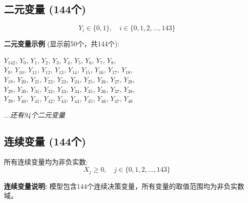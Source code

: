 \documentclass[a4paper,10pt]{article}
\begin{document}
\subsection{二元变量 (144个)}

\begin{equation}
Y_i \in \{0,1\}, \quad i \in \{0, 1, 2, \ldots, 143\}
\end{equation}

\textbf{二元变量示例} (显示前50个，共144个):

{\small
$Y_{142}$, $Y_{0}$, $Y_{1}$, $Y_{2}$, $Y_{3}$, $Y_{4}$, $Y_{5}$, $Y_{6}$, $Y_{7}$, $Y_{8}$, \\
$Y_{9}$, $Y_{10}$, $Y_{11}$, $Y_{12}$, $Y_{13}$, $Y_{14}$, $Y_{15}$, $Y_{16}$, $Y_{17}$, $Y_{18}$, \\
$Y_{19}$, $Y_{20}$, $Y_{21}$, $Y_{22}$, $Y_{23}$, $Y_{24}$, $Y_{25}$, $Y_{26}$, $Y_{27}$, $Y_{28}$, \\
$Y_{29}$, $Y_{30}$, $Y_{31}$, $Y_{32}$, $Y_{33}$, $Y_{34}$, $Y_{35}$, $Y_{36}$, $Y_{37}$, $Y_{38}$, \\
$Y_{39}$, $Y_{40}$, $Y_{41}$, $Y_{42}$, $Y_{43}$, $Y_{44}$, $Y_{45}$, $Y_{46}$, $Y_{47}$, $Y_{48}$

\textit{...还有94个二元变量}
}

\subsection{连续变量 (144个)}

所有连续变量均为非负实数:
\begin{equation}
X_j \geq 0, \quad j \in \{0, 1, 2, \ldots, 143\}
\end{equation}

\textbf{连续变量说明:} 模型包含144个连续决策变量，所有变量的取值范围均为非负实数域。
\end{document}
